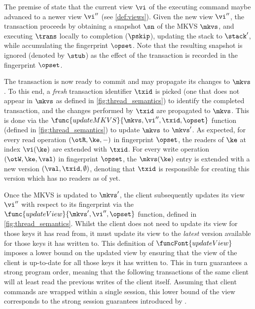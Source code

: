 
The premise of  state that the current view $\vi$ of the executing command maybe advanced to a newer view $\vi''$ (see \cref{def:views}). 
Given the new view $\vi''$, the transaction proceeds by obtaining a snapshot $\sn$ of the MKVS $\mkvs$, and executing $\trans$ locally to completion ($\pskip$), updating the stack to $\stack'$, while accumulating the fingerprint $\opset$. Note that the resulting snapshot is ignored (denoted by $\stub$) as the effect of the transaction is recorded in the fingerprint $\opset$. 
%

The transaction is now ready to commit and may propagate its changes to $\mkvs$.
To this end, a \emph{fresh} transaction identifier $\txid$ is picked (\ie one that does not appear in $\mkvs$ as defined in \cref{fig:thread_semantics}) to identify the completed transaction, and the changes performed by $\txid$ are propagated to $\mkvs$. 
This is done via the $\func{updateMKVS}{\mkvs, \vi'', \txid, \opset}$ function (defined in \cref{fig:thread_semantics}) to update $\mkvs$ to  $\mkvs'$. 
As expected, for every read operation $(\otR, \ke, -)$ in fingerprint $\opset$, the readers of $\ke$ at index $\vi(\ke)$ are extended with $\txid$.
For every write operation $(\otW, \ke, \val)$ in fingerprint $\opset$, the $\mkvs(\ke)$ entry is extended with a new version $(\val, \txid, \emptyset)$, denoting that $\txid$ is responsible for creating this version which has no readers as of yet. 

Once the MKVS is updated to $\mkvs'$, the client subsequently updates its view $\vi''$ with respect to its fingerprint via the $\func{updateView}{\mkvs', \vi'', \opset}$ function, defined in \cref{fig:thread_semantics}.
Whilst the client does not need to update its view for those keys it has read from, 
it must update its view to the \emph{latest} version available for those keys it has written to. %
This definition of $\funcFont{updateView}$ imposes a lower bound on the updated view by ensuring that the view of the client is up-to-date for all those keys it has written to. 
This in turn guarantees a strong program order, meaning that the following transactions of the same client will at least read the previous writes of the client  itself.
Assuming that client commands are wrapped within a single session, this lower bound of the view corresponds to the strong session guarantees introduced by \cite{.........}.

